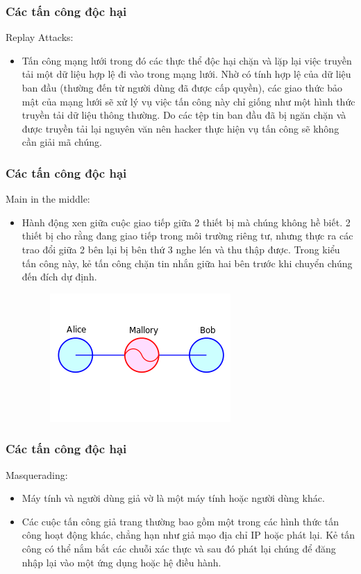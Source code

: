 \documentclass{beamer}
\begin{document}
\begin{frame}
\frametitle{Các tấn công độc hại}
    \begin{block}{Replay Attacks:}
         \begin{itemize}
    \item Tấn công mạng lưới trong đó các thực thể độc hại chặn và lặp lại việc truyền tải một dữ liệu hợp lệ đi vào trong mạng lưới. Nhờ có tính hợp lệ của dữ liệu ban đầu (thường đến từ người dùng đã được cấp quyền), các giao thức bảo mật của mạng lưới sẽ xử lý vụ việc tấn công này chỉ giống như một hình thức truyền tải dữ liệu thông thường. Do các tệp tin ban đầu  đã bị ngăn chặn và được truyền tải lại nguyên văn nên hacker thực hiện vụ tấn công sẽ không cần giải mã chúng.
\end{itemize}
    \end{block}
\end{frame}

\begin{frame}
\frametitle{Các tấn công độc hại}
    \begin{block}{Main in the middle:}
         \begin{itemize}
    \item Hành động xen giữa cuộc giao tiếp giữa 2 thiết bị mà chúng không hề biết. 2 thiết bị cho rằng đang giao tiếp trong môi trường riêng tư, nhưng thực ra các trao đổi giữa 2 bên lại bị bên thứ 3 nghe lén và thu thập được. Trong kiểu tấn công này, kẻ tấn công chặn tin nhắn giữa hai bên trước khi chuyển chúng đến đích dự định.
    \begin{figure}[h]
    \centering\includegraphics[width=0.4\linewidth]{images/man-in-middle.png}
    \end{figure}
\end{itemize}
    \end{block}
\end{frame}
\begin{frame}
\frametitle{Các tấn công độc hại}
    \begin{block}{Masquerading:}
         \begin{itemize}
    \item Máy tính và người dùng giả vờ là một máy tính hoặc người dùng khác.
    \item Các cuộc tấn công giả trang thường bao gồm một trong các hình thức tấn công hoạt động khác, chẳng hạn như giả mạo địa chỉ IP hoặc phát lại. Kẻ tấn công có thể nắm bắt các chuỗi xác thực và sau đó phát lại chúng để đăng nhập lại vào một ứng dụng hoặc hệ điều hành.
\end{itemize}
    \end{block}
\end{frame}
\end{document}
